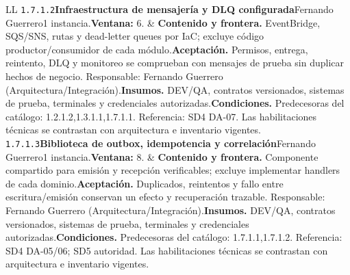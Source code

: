 \begin{longtable}{L{\tabcolsep\relax}L{\tabcolsep\relax}}
\texttt{1.\allowbreak{}7.\allowbreak{}1.\allowbreak{}2}\newline{}\textbf{Infraestructura de mensajería y DLQ configurada}\newline{}Fernando Guerrero\newline{}1 instancia.\newline{}\textbf{Ventana:} 6. & \textbf{Contenido y frontera.} EventBridge, SQS/SNS, rutas y dead-letter queues por IaC; excluye código productor/consumidor de cada módulo.\newline{}\textbf{Aceptación.} Permisos, entrega, reintento, DLQ y monitoreo se comprueban con mensajes de prueba sin duplicar hechos de negocio. Responsable: Fernando Guerrero (Arquitectura/Integración).\newline{}\textbf{Insumos.} DEV/QA, contratos versionados, sistemas de prueba, terminales y credenciales autorizadas.\newline{}\textbf{Condiciones.} Predecesoras del catálogo: 1.2.1.2,1.3.1.1,1.7.1.1. Referencia: SD4 DA-07. Las habilitaciones técnicas se contrastan con arquitectura e inventario vigentes.\\\hline
\texttt{1.\allowbreak{}7.\allowbreak{}1.\allowbreak{}3}\newline{}\textbf{Biblioteca de outbox, idempotencia y correlación}\newline{}Fernando Guerrero\newline{}1 instancia.\newline{}\textbf{Ventana:} 8. & \textbf{Contenido y frontera.} Componente compartido para emisión y recepción verificables; excluye implementar handlers de cada dominio.\newline{}\textbf{Aceptación.} Duplicados, reintentos y fallo entre escritura/emisión conservan un efecto y recuperación trazable. Responsable: Fernando Guerrero (Arquitectura/Integración).\newline{}\textbf{Insumos.} DEV/QA, contratos versionados, sistemas de prueba, terminales y credenciales autorizadas.\newline{}\textbf{Condiciones.} Predecesoras del catálogo: 1.7.1.1,1.7.1.2. Referencia: SD4 DA-05/06; SD5 autoridad. Las habilitaciones técnicas se contrastan con arquitectura e inventario vigentes.\\\hline

\end{longtable}
